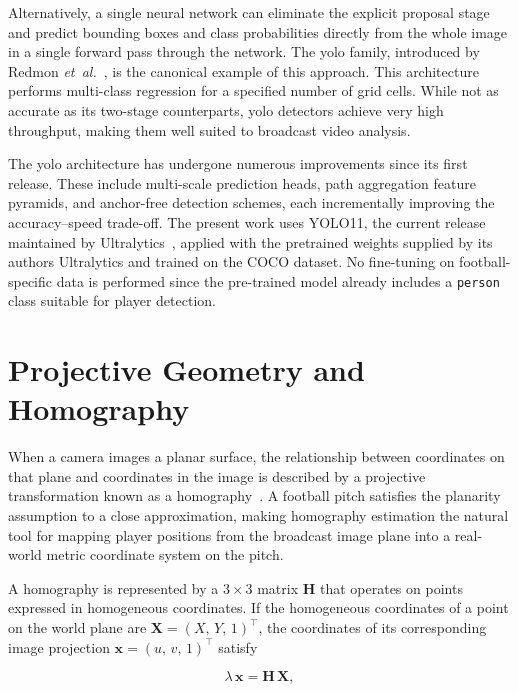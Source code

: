 Alternatively, a single neural network can eliminate the explicit proposal stage and predict bounding boxes and class probabilities directly from the whole image in a single forward pass through the network. The \gls{yolo} family, introduced by Redmon \textit{et~al.}~\cite{redmon2016yolo}, is the canonical example of this approach. This architecture performs multi-class regression for a specified number of grid cells. While not as accurate as its two-stage counterparts, \gls{yolo} detectors achieve very high throughput, making them well suited to broadcast video analysis.

The \gls{yolo} architecture has undergone numerous improvements since its first release. These include multi-scale prediction heads, path aggregation feature pyramids, and anchor-free detection schemes, each incrementally improving the accuracy--speed trade-off. The present work uses YOLO11, the current release maintained by Ultralytics~\cite{ultralytics2024yolo11}, applied with the pretrained weights supplied by its authors Ultralytics and trained on the COCO dataset. No fine-tuning on football-specific data is performed since the pre-trained model already includes a \texttt{person} class suitable for player detection.

\section{Projective Geometry and Homography}%
\label{sec:bg_geometry}

When a camera images a planar surface, the relationship between coordinates on that plane and coordinates in the image is described by a projective transformation known as a homography~\cite{hartley2004multiple}. A football pitch satisfies the planarity assumption to a close approximation, making homography estimation the natural tool for mapping player positions from the broadcast image plane into a real-world metric coordinate system on the pitch.

A homography is represented by a $3 \times 3$ matrix $\mathbf{H}$ that operates on points expressed in homogeneous coordinates. If the homogeneous coordinates of a point on the world plane are $\mathbf{X} = (X,\, Y,\, 1)^{\top}$, the coordinates of its corresponding image projection $\mathbf{x} = (u,\, v,\, 1)^{\top}$ satisfy

\begin{equation}
  \lambda\,\mathbf{x} = \mathbf{H}\,\mathbf{X},
  \label{eq:homography}
\end{equation}

